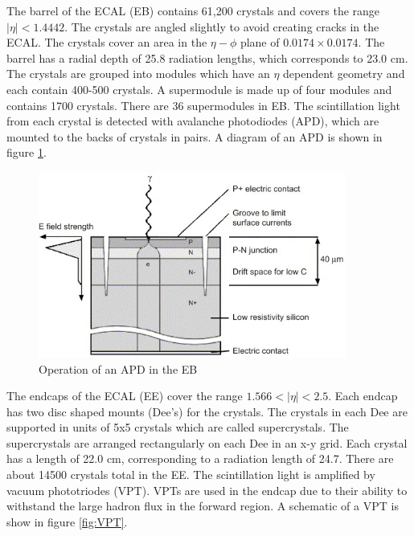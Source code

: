 \documentclass[oneside, letterpaper, oldfontcommands]{memoir}
\begin{document}
\qquad The barrel of the ECAL (EB) contains 61,200 crystals and covers the range $|\eta| < 1.4442$. The crystals are angled slightly to avoid creating cracks in the ECAL. The crystals cover an area in the $\eta - \phi$ plane of $0.0174 \times 0.0174$. The barrel has a radial depth of 25.8 radiation lengths, which corresponds to 23.0 cm. The crystals are grouped into modules which have an $\eta$ dependent geometry and each contain 400-500 crystals. A supermodule is made up of four modules and contains 1700 crystals. There are 36 supermodules in EB. The scintillation light from each crystal is detected with avalanche photodiodes (APD), which are mounted to the backs of crystals in pairs. A diagram of an APD is shown in figure \ref{fig:APD}. 

\begin{figure}[here]
\includegraphics[width=0.9\textwidth]{apd.jpg}
\caption{Operation of an APD in the EB  \cite{Brown:2007cg}}
\label{fig:APD}
\end{figure}


\qquad The endcaps of the ECAL (EE) cover the range $1.566 < |\eta| < 2.5$. Each endcap has two disc shaped mounts (Dee's) for the crystals. The crystals in each Dee are supported in units of 5x5 crystals which are called supercrystals. The supercrystals are arranged rectangularly on each Dee in an x-y grid. Each crystal has a length of 22.0 cm, corresponding to a radiation length of 24.7. There are about 14500 crystals total in the EE. The scintillation light is amplified by vacuum phototriodes (VPT). VPTs are used in the endcap due to their ability to withstand the large hadron flux in the forward region. A schematic of a VPT is show in figure \ref{fig:VPT}.
\end{document}
